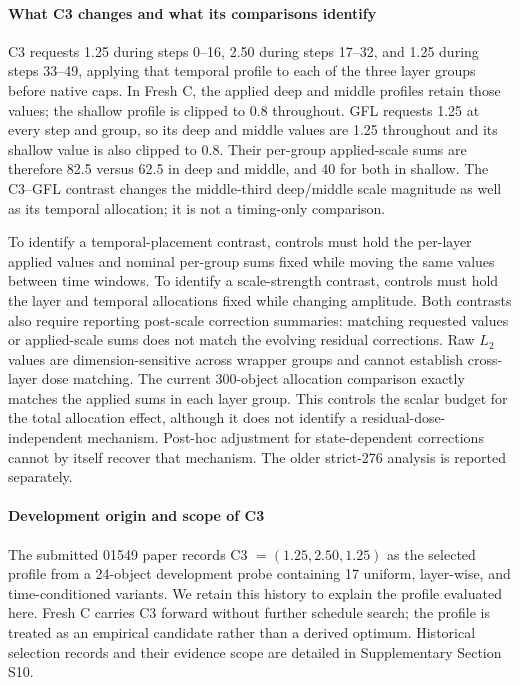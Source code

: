 \documentclass[times,twocolumn,final]{elsarticle}
\begin{document}
\paragraph{What C3 changes and what its comparisons identify}
C3 requests 1.25 during steps 0--16, 2.50 during steps 17--32, and 1.25 during steps 33--49, applying that temporal profile to each of the three layer groups before native caps. In Fresh C, the applied deep and middle profiles retain those values; the shallow profile is clipped to 0.8 throughout. GFL requests 1.25 at every step and group, so its deep and middle values are 1.25 throughout and its shallow value is also clipped to 0.8. Their per-group applied-scale sums are therefore 82.5 versus 62.5 in deep and middle, and 40 for both in shallow. The C3--GFL contrast changes the middle-third deep/middle scale magnitude as well as its temporal allocation; it is not a timing-only comparison.

To identify a temporal-placement contrast, controls must hold the per-layer applied values and nominal per-group sums fixed while moving the same values between time windows. To identify a scale-strength contrast, controls must hold the layer and temporal allocations fixed while changing amplitude. Both contrasts also require reporting post-scale correction summaries: matching requested values or applied-scale sums does not match the evolving residual corrections. Raw $L_2$ values are dimension-sensitive across wrapper groups and cannot establish cross-layer dose matching. The current 300-object allocation comparison exactly matches the applied sums in each layer group. This controls the scalar budget for the total allocation effect, although it does not identify a residual-dose-independent mechanism. Post-hoc adjustment for state-dependent corrections cannot by itself recover that mechanism. The older strict-276 analysis is reported separately.

\paragraph{Development origin and scope of C3}
The submitted 01549 paper records C3 $=(1.25,2.50,1.25)$ as the selected profile from a 24-object development probe containing 17 uniform, layer-wise, and time-conditioned variants. We retain this history to explain the profile evaluated here. Fresh C carries C3 forward without further schedule search; the profile is treated as an empirical candidate rather than a derived optimum. Historical selection records and their evidence scope are detailed in Supplementary Section S10.
\end{document}
